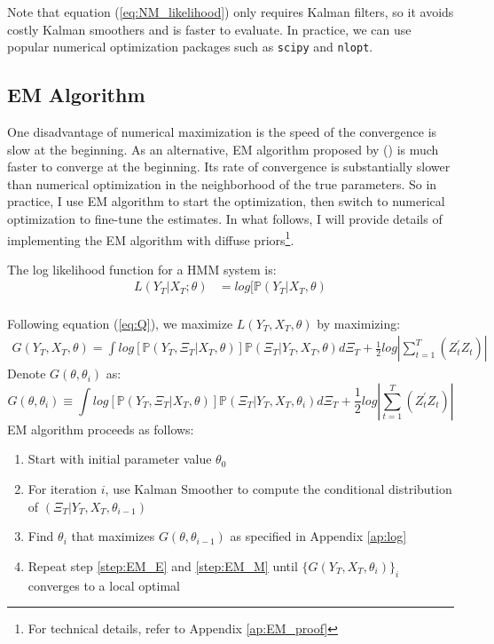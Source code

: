 \documentclass[10pt]{article}
\newenvironment{boenumerate}
    {\begin{enumerate}\renewcommand\labelenumi{\textbf\theenumi}}
    {\end{enumerate}}
\numberwithin{equation}{section}
\begin{document}
Note that equation (\ref{eq:NM_likelihood}) only requires Kalman filters, so it avoids costly Kalman smoothers and is faster to evaluate. In practice, we can use popular numerical optimization packages such as \texttt{scipy} and \texttt{nlopt}.

\subsection{EM Algorithm} \label{subsec:EM}
One disadvantage of numerical maximization is the speed of the convergence is slow at the beginning. As an alternative, EM algorithm proposed by (\cite{shumway_stoffer_1982}) is much faster to converge at the beginning. Its rate of convergence is substantially slower than numerical optimization in the neighborhood of the true parameters. So in practice, I use EM algorithm to start the optimization, then switch to numerical optimization to fine-tune the estimates. In what follows, I will provide details of implementing the EM algorithm with diffuse priors\footnote{For technical details, refer to Appendix \ref{ap:EM_proof}}.  

The log likelihood function for a HMM system is:
\begin{align*}
    L(Y_T|X_T; \theta) &= log[\mathbb{P}(Y_T|X_T,\theta) \\
\end{align*}

Following equation (\ref{eq:Q}), we maximize $L(Y_T,X_T,\theta)$ by maximizing: 
\begin{align*}
    G(Y_T,X_T,\theta) = \int log[\mathbb{P}(Y_T,\Xi_T|X_T,\theta)]\mathbb{P}(\Xi_T|Y_T,X_T,\theta)d\Xi_T + \frac{1}{2}log\left|\sum_{t=1}^{T}(Z_t^{'}Z_t)\right| 
\end{align*}
Denote $G(\theta,\theta_i)$ as: 
\[
    G(\theta,\theta_i) \equiv \int log[\mathbb{P}(Y_T,\Xi_T|X_T,\theta)]\mathbb{P}(\Xi_T|Y_T,X_T,\theta_i)d\Xi_T + \frac{1}{2}log\left|\sum_{t=1}^{T}(Z_t^{'}Z_t)\right| 
\]
EM algorithm proceeds as follows:
\begin{boenumerate}
    \item Start with initial parameter value $\theta_0$
    \item \label{step:EM_E} For iteration $i$, use Kalman Smoother to compute the conditional distribution of $(\Xi_T|Y_T,X_T,\theta_{i-1})$
    \item \label{step:EM_M} Find $\theta_{i}$ that maximizes $G(\theta,\theta_{i-1})$ as specified in Appendix \ref{ap:log} 
    \item Repeat step \ref{step:EM_E} and \ref{step:EM_M} until $\{G(Y_T,X_T,\theta_i)\}_i$ converges to a local optimal
\end{boenumerate}
\end{document}
